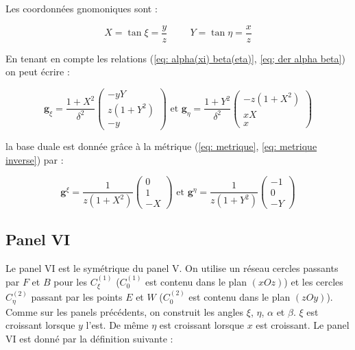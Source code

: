Les coordonnées gnomoniques sont :

\begin{equation}
X = \tan \xi = \dfrac{y}{z} \hspace{1cm} Y = \tan \eta = \dfrac{x}{z}
\end{equation}

En tenant en compte les relations (\ref{eq: alpha(xi) beta(eta)}, \ref{eq; der alpha beta}) on peut écrire : 

\begin{equation}
\mathbf{g}_{\xi} = \dfrac{1+X^2}{\delta^2} \begin{pmatrix}
-yY \\ z(1+Y^2) \\ -y
\end{pmatrix} \text{ et } \mathbf{g}_{\eta} = \dfrac{1+Y^2}{\delta^2} \begin{pmatrix}
-z(1+X^2) \\ xX \\ x
\end{pmatrix}
\label{eq: base locale V}
\end{equation}

la base duale est donnée grâce à la métrique (\ref{eq: metrique}, \ref{eq: metrique inverse}) par :

\begin{equation}
\mathbf{g}^{\xi} = \dfrac{1}{z(1+X^2)}\begin{pmatrix}
0 \\ 1 \\ -X
\end{pmatrix} \text{ et } \mathbf{g}^{\eta} = \dfrac{1}{z(1+Y^2)}\begin{pmatrix}
-1 \\ 0 \\ -Y
\end{pmatrix}
\label{eq: base duale V}
\end{equation}













\subsection{Panel VI}

Le panel VI est le symétrique du panel V. On utilise un réseau cercles passants par $F$ et $B$ pour les $C_{\xi}^{(1)}$ ($C_{0}^{(1)}$ est contenu dans le plan $(xOz)$) et les cercles $C_{\eta}^{(2)}$ passant par les points $E$ et $W$ ($C_{0}^{(2)}$ est contenu dans le plan $(zOy)$). Comme sur les panels précédents, on construit les angles $\xi$, $\eta$, $\alpha$ et $\beta$. $\xi$ est croissant lorsque $y$ l'est. De même $\eta$ est croissant lorsque $x$ est croissant.
Le panel VI est donné par la définition suivante :

